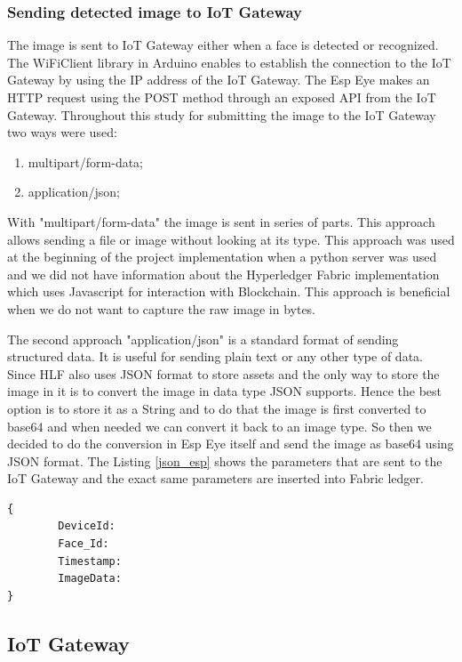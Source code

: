 \subsubsection{Sending detected image to IoT Gateway} 

The image is sent to IoT Gateway either when a face is detected or recognized. The WiFiClient library in Arduino enables to establish the connection to the IoT Gateway by using the IP address of the IoT Gateway. The Esp Eye makes an HTTP request using the POST method through an exposed API from the IoT Gateway. Throughout this study for submitting the image to the IoT Gateway two ways were used: 
\begin{enumerate}
    \item multipart/form-data;
    \item application/json;
\end{enumerate}

With "multipart/form-data" the image is sent in series of parts. This approach allows sending a file or image without looking at its type. This approach was used at the beginning of the project implementation when a python server was used and we did not have information about the Hyperledger Fabric implementation which uses Javascript for interaction with Blockchain. This approach is beneficial when we do not want to capture the raw image in bytes. 

The second approach "application/json" is a standard format of sending structured data. It is useful for sending plain text or any other type of data. Since HLF also uses JSON format to store assets and the only way to store the image in it is to convert the image in data type JSON supports. Hence the best option is to store it as a String and to do that the image is first converted to {\selectfont base64} and when needed we can convert it back to an image type. So then we decided to do the conversion in Esp Eye itself and send the image as {\selectfont base64} using JSON format. 
The Listing \ref{json_esp} shows the parameters that are sent to the IoT Gateway and the exact same parameters are inserted into Fabric ledger.
\begin{lstlisting}[caption={JSON structure in Esp Eye.},label=json_esp, captionpos=b]
{
        DeviceId: 
        Face_Id: 
        Timestamp: 
        ImageData: 
}

\end{lstlisting}


\subsection{IoT Gateway}

